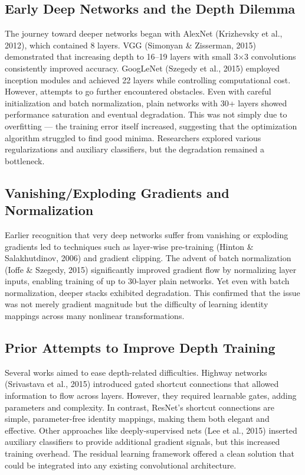 \documentclass[11pt,a4paper]{article}
\begin{document}
\subsection{Early Deep Networks and the Depth Dilemma}
The journey toward deeper networks began with AlexNet (Krizhevsky et al., 2012), which contained 8 layers. VGG (Simonyan \& Zisserman, 2015) demonstrated that increasing depth to 16–19 layers with small 3×3 convolutions consistently improved accuracy. GoogLeNet (Szegedy et al., 2015) employed inception modules and achieved 22 layers while controlling computational cost. However, attempts to go further encountered obstacles. Even with careful initialization and batch normalization, plain networks with 30+ layers showed performance saturation and eventual degradation. This was not simply due to overfitting — the training error itself increased, suggesting that the optimization algorithm struggled to find good minima. Researchers explored various regularizations and auxiliary classifiers, but the degradation remained a bottleneck.

\subsection{Vanishing/Exploding Gradients and Normalization}
Earlier recognition that very deep networks suffer from vanishing or exploding gradients led to techniques such as layer-wise pre-training (Hinton \& Salakhutdinov, 2006) and gradient clipping. The advent of batch normalization (Ioffe \& Szegedy, 2015) significantly improved gradient flow by normalizing layer inputs, enabling training of up to 30-layer plain networks. Yet even with batch normalization, deeper stacks exhibited degradation. This confirmed that the issue was not merely gradient magnitude but the difficulty of learning identity mappings across many nonlinear transformations.

\subsection{Prior Attempts to Improve Depth Training}
Several works aimed to ease depth-related difficulties. Highway networks (Srivastava et al., 2015) introduced gated shortcut connections that allowed information to flow across layers. However, they required learnable gates, adding parameters and complexity. In contrast, ResNet's shortcut connections are simple, parameter-free identity mappings, making them both elegant and effective. Other approaches like deeply-supervised nets (Lee et al., 2015) inserted auxiliary classifiers to provide additional gradient signals, but this increased training overhead. The residual learning framework offered a clean solution that could be integrated into any existing convolutional architecture.
\end{document}
